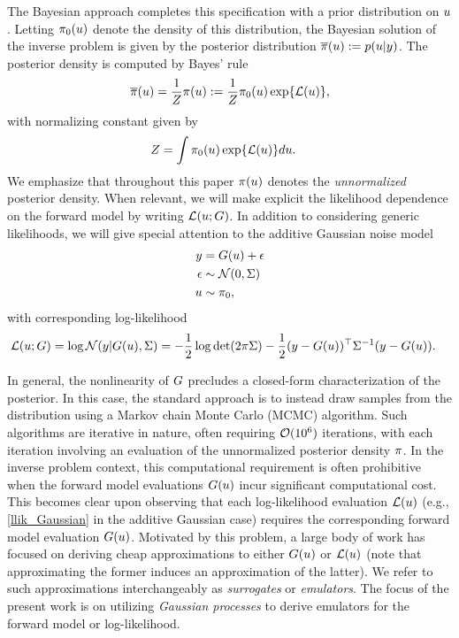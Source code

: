 \documentclass[12pt]{article}
\begin{document}
The Bayesian approach completes this specification with a prior distribution 
on $u$. Letting $\pi_0(u)$ denote the density of this distribution, the Bayesian solution of the inverse problem is given 
by the posterior distribution $\overline{\pi}(u) := p(u | y)$. The posterior density is computed by Bayes' rule 
\begin{align}
\overline{\pi}(u) = \frac{1}{Z}\pi(u) := \frac{1}{Z} \pi_0(u) \exp\mathopen{}\left\{\mathcal{L}(u)\right\}\mathclose{}, \label{post_dens}
\end{align}
with normalizing constant given by 
\begin{align}
Z &= \int \pi_0(u) \exp\mathopen{}\left\{\mathcal{L}(u)\right\}\mathclose{} du. \label{norm_cst}
\end{align}
We emphasize that throughout this paper $\pi(u)$ denotes the \textit{unnormalized} 
posterior density. When relevant, we will make explicit the likelihood dependence on the forward 
model by writing $\mathcal{L}(u; G)$. In addition to considering 
generic likelihoods, we will give special attention to the additive Gaussian noise model
\begin{align}
y &= G(u) + \epsilon \label{inv_prob_Gaussian} \\
\epsilon &\sim \mathcal{N}(0, \Sigma) \nonumber \\
u &\sim \pi_0 \nonumber, 
\end{align}
with corresponding log-likelihood 
\begin{align}
\mathcal{L}(u; G) &= \log\mathcal{N}(y| G(u), \Sigma) 
= -\frac{1}{2} \log\det (2\pi \Sigma) - \frac{1}{2} (y - G(u))^\top \Sigma^{-1} (y - G(u)). \label{llik_Gaussian}
\end{align}

In general, the nonlinearity of $G$ precludes a closed-form characterization of the posterior. In this case, the 
standard approach is to instead draw samples from the distribution using a Markov chain Monte Carlo (MCMC) 
algorithm. Such algorithms are iterative in nature, often requiring $\mathcal{O}(10^6)$ iterations, with each 
iteration involving an evaluation of the unnormalized posterior density $\pi$. In the inverse problem 
context, this computational requirement is often prohibitive when the forward model evaluations $G(u)$
incur significant computational cost. This becomes clear upon observing that each log-likelihood evaluation 
$\mathcal{L}(u)$ (e.g., \ref{llik_Gaussian} in the additive Gaussian case) requires the corresponding forward 
model evaluation $G(u)$. Motivated by this problem, a large body of work has focused on deriving 
cheap approximations to either $G(u)$ or $\mathcal{L}(u)$ (note that approximating the former induces 
an approximation of the latter). We refer to such approximations interchangeably 
as \textit{surrogates} or \textit{emulators}. The focus of the present work is on utilizing \textit{Gaussian processes} 
to derive emulators for the forward model or log-likelihood. 
\end{document}

